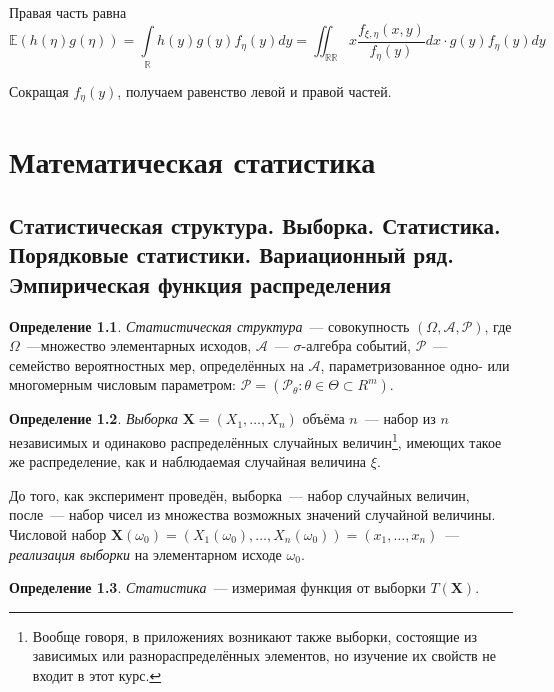 \documentclass[oneside,final,14pt]{extreport}
\theoremstyle{plain}
\theoremstyle{definition}
\newtheorem*{defn}{Определение}
\theoremstyle{named}
\begin{document}
    Правая часть равна
    \begin{equation*}
        \mathbb{E}(h(\eta) g(\eta))=\int\limits_{\mathbb{R}} h(y) g(y) f_{\eta}(y) d y=\iint_{\mathbb{R} \mathbb{R}} x \frac{f_{\xi, \eta}(x, y)}{f_{\eta}(y)} d x \cdot g(y) f_{\eta}(y) d y
    \end{equation*}
    
    Сокращая $f_{\eta}(y)$, получаем равенство левой и правой частей.

\chapter{Математическая статистика}

\section{Статистическая структура. Выборка. Статистика. Порядковые статистики. Вариационный ряд. Эмпирическая функция распределения}

\begin{defn}
{\it Статистическая структура}~--- совокупность $(\Omega, \mathcal{A}, \mathcal{P})$, где $\Omega$~---множество элементарных исходов, $\mathcal{A}$~--- $\sigma$-алгебра событий, $\mathcal{P}$~--- семейство вероятностных мер, определённых на $\mathcal{A}$, параметризованное одно- или многомерным числовым параметром: $\mathcal{P} = (\mathcal{P}_{\theta}:\theta \in \Theta \subset R^{m})$.
\end{defn}

\begin{defn}
{\it Выборка} $\mathbf{X} = (X_{1}, \ldots, X_{n})$ объёма $n$~--- набор из $n$ независимых и одинаково распределённых случайных величин\footnote{Вообще говоря, в приложениях возникают также выборки, состоящие из зависимых или разнораспределённых элементов, но изучение их свойств не входит в этот курс.}, имеющих такое же распределение, как и наблюдаемая случайная величина $\xi$.

\end{defn}

До того, как эксперимент проведён, выборка~--- набор случайных величин, после~--- набор чисел из множества возможных значений случайной величины. Числовой набор $\mathbf{X}(\omega_0) = (X_{1}(\omega_0), \ldots, X_{n}(\omega_0)) = (x_1, \ldots, x_n)$~--- {\it реализация выборки} на элементарном исходе $\omega_0$.

\begin{defn}
{\it Статистика}~--- измеримая функция от выборки $T(\mathbf{X})$.
\end{defn}
\end{document}
